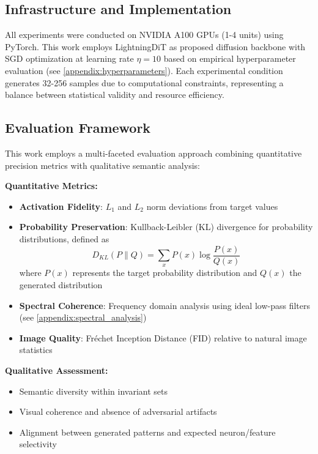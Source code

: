 \documentclass[licencjacka,en]{pracamgr}
\begin{document}
\subsection{Infrastructure and Implementation}

All experiments were conducted on NVIDIA A100 GPUs (1-4 units) using PyTorch. This work employs LightningDiT as proposed diffusion backbone with SGD optimization at learning rate $\eta = 10$ based on empirical hyperparameter evaluation (see \cref{appendix:hyperparameters}). Each experimental condition generates 32-256 samples due to computational constraints, representing a balance between statistical validity and resource efficiency.

\subsection{Evaluation Framework}

This work employs a multi-faceted evaluation approach combining quantitative precision metrics with qualitative semantic analysis:

\textbf{Quantitative Metrics:}
\begin{itemize}
\item \textbf{Activation Fidelity}: $L_1$ and $L_2$ norm deviations from target values
\item \textbf{Probability Preservation}: Kullback-Leibler (KL) divergence for probability distributions, defined as
\begin{equation}
D_{KL}(P \parallel Q) = \sum_{x} P(x) \log \frac{P(x)}{Q(x)}
\end{equation}
where $P(x)$ represents the target probability distribution and $Q(x)$ the generated distribution
\item \textbf{Spectral Coherence}: Frequency domain analysis using ideal low-pass filters (see \cref{appendix:spectral_analysis})
\item \textbf{Image Quality}: Fréchet Inception Distance (FID) relative to natural image statistics
\end{itemize}

\textbf{Qualitative Assessment:}
\begin{itemize}
\item Semantic diversity within invariant sets
\item Visual coherence and absence of adversarial artifacts
\item Alignment between generated patterns and expected neuron/feature selectivity
\end{itemize}
\end{document}
